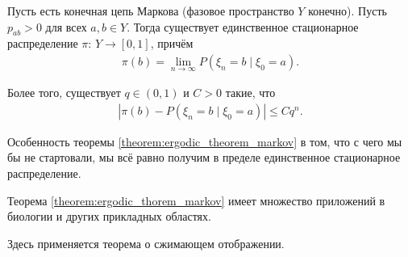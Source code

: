 \documentclass[../main.tex]{subfiles}
\begin{document}
\begin{thm}
 \label{theorem:ergodic_thorem_markov}
 Пусть есть конечная цепь Маркова (фазовое пространство $ Y $ конечно). Пусть $ p_{ab} > 0 $ для всех $ a,b\in Y $. Тогда существует единственное стационарное распределение $ \pi\colon\,Y\to[0,1] $, причём
 \begin{align*}
  \pi(b) = \lim_{n \to \infty} P(\xi_n = b \mid \xi_0 = a).
 \end{align*}

 Более того, существует $ q \in (0,1) $ и $ C> 0 $ такие, что
 \begin{align*}
  \left| \pi(b) - P(\xi_n = b \mid \xi_0 = a) \right| \leqslant C q^{n}.
 \end{align*}
\end{thm}

Особенность теоремы \ref{theorem:ergodic_theorem_markov} в том, что с чего мы бы не стартовали, мы всё равно получим в пределе единственное стационарное распределение.

Теорема \ref{theorem:ergodic_thorem_markov} имеет множество приложений в биологии и других прикладных областях.

Здесь применяется теорема о сжимающем отображении.
\end{document}
